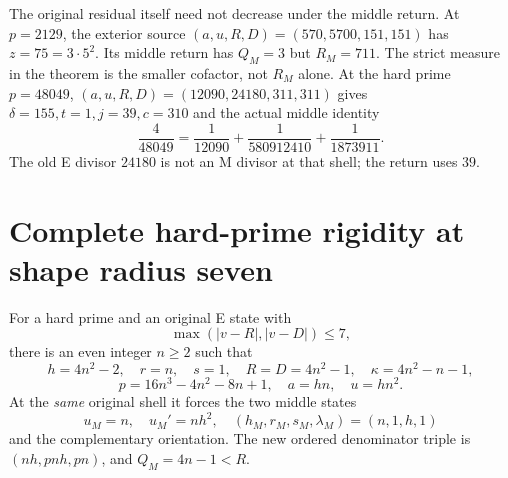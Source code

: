 The original residual itself need not decrease under the middle return.
At $p=2129$, the exterior source $(a,u,R,D)=(570,5700,151,151)$ has
$z=75=3\cdot5^2$. Its middle return has $Q_M=3$ but $R_M=711$.
The strict measure in the theorem is the smaller cofactor, not $R_M$ alone.
At the hard prime $p=48049$, $(a,u,R,D)=(12090,24180,311,311)$ gives
$\delta=155,t=1,j=39,c=310$ and the actual middle identity
\[
 \boxed{\frac4{48049}=\frac1{12090}+\frac1{580912410}
                         +\frac1{1873911}.}              \tag{13}
\]
The old E divisor $24180$ is not an M divisor at that shell; the return uses $39$.

\section{Complete hard-prime rigidity at shape radius seven}
\begin{theorem}\label{thm:rigid}
For a hard prime and an original E state with
\[
 \max(|v-R|,|v-D|)\le7,
\]
there is an even integer $n\ge2$ such that
\[
 \boxed{h=4n^2-2,\quad r=n,\quad s=1,\quad
 R=D=4n^2-1,\quad\kappa=4n^2-n-1,}                       \tag{14}
\]
\[
 p=16n^3-4n^2-8n+1,\quad a=hn,\quad u=hn^2.
\]
At the \emph{same} original shell it forces the two middle states
\[
 \boxed{u_M=n,\quad u_M'=nh^2,\quad
 (h_M,r_M,s_M,\lambda_M)=(n,1,h,1)}                       \tag{15}
\]
and the complementary orientation. The new ordered denominator triple is
$(nh,pnh,pn)$, and $Q_M=4n-1<R$.
\end{theorem}
